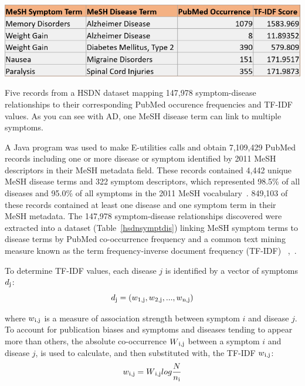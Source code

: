 \documentclass{IEEEtran}
\begin{document}
	\begin{table}[h]
		\centering
		\includegraphics[width=\linewidth]{hsdnsymptdis}
		\caption{\footnotesize  Five records from a HSDN dataset mapping 147,978 symptom-disease relationships to their corresponding PubMed occurence frequencies and TF-IDF values. As you can see with AD, one MeSH disease term can link to multiple symptoms.}
		\label{hsdnsymptdis}
	\end{table}  
	
	A Java program was used to make E-utilities calls and obtain 7,109,429 PubMed records including one or more disease or symptom identified by 2011 MeSH descriptors in their MeSH metadata field.  These records contained 4,442 unique MeSH disease terms and 322 symptom descriptors, which represented 98.5\% of all diseases and 95.0\% of all symptoms in the 2011 MeSH vocabulary~\cite{hsdn}.  849,103 of these records contained at least one disease and one symptom term in their MeSH metadata.  The 147,978 symptom-disease relationships discovered were extracted into a dataset (Table~\ref{hsdnsymptdis}) linking MeSH symptom terms to disease terms by PubMed co-occurrence frequency and a common text mining measure known as the term frequency-inverse document frequency (TF-IDF) ~\cite{tfidf},~\cite{hsdn}.
	
	
	To determine TF-IDF values, each disease $j$ is identified by a vector of symptoms $d\textsubscript{j}$:
	\begin{equation}
	\label{dij}
	d\textsubscript{j} = (w\textsubscript{1,j}, w\textsubscript{2,j},... , w\textsubscript{n,j})
	\end{equation}
	
	\noindent where $w\textsubscript{i,j}$ is a measure of association strength between symptom $i$ and disease $j$.
	To account for publication biases and symptoms and diseases tending to appear more than others, the absolute co-occurrence $W\textsubscript{i,j}$ between a symptom $i$ and disease $j$, is used to calculate, and then substituted with, the TF-IDF $w\textsubscript{i,j}$:
	\begin{equation}
	 \label{wij}
	 w\textsubscript{i,j} = W\textsubscript{i,j}log\frac{N}{n\textsubscript{i}}
	 \end{equation}
	
\end{document}
